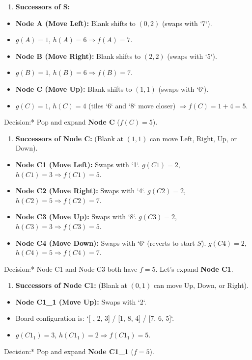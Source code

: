 \begin{enumerate}
  \item \textbf{Successors of S:}
\end{enumerate}
\begin{itemize}
  \item   \textbf{Node A (Move Left):} Blank shifts to $(0,2)$ (swaps with `7`).
  \item   $g(A) = 1$, $h(A) = 6 \Rightarrow f(A) = 7$.
  \item   \textbf{Node B (Move Right):} Blank shifts to $(2,2)$ (swaps with `5`).
  \item   $g(B) = 1$, $h(B) = 6 \Rightarrow f(B) = 7$.
  \item   \textbf{Node C (Move Up):} Blank shifts to $(1,1)$ (swaps with `6`).
  \item   $g(C) = 1$, $h(C) = 4$ (tiles `6` and `8` move closer) $\Rightarrow f(C) = 1 + 4 = 5$.
\end{itemize}
    \textit{   }Decision:* Pop and expand \textbf{Node C} ($f(C) = 5$).

\begin{enumerate}
  \item \textbf{Successors of Node C:} (Blank at $(1,1)$ can move Left, Right, Up, or Down).
\end{enumerate}
\begin{itemize}
  \item   \textbf{Node C1 (Move Left):} Swaps with `1`. $g(C1) = 2$, $h(C1) = 3 \Rightarrow f(C1) = 5$.
  \item   \textbf{Node C2 (Move Right):} Swaps with `4`. $g(C2) = 2$, $h(C2) = 5 \Rightarrow f(C2) = 7$.
  \item   \textbf{Node C3 (Move Up):} Swaps with `8`. $g(C3) = 2$, $h(C3) = 3 \Rightarrow f(C3) = 5$.
  \item   \textbf{Node C4 (Move Down):} Swaps with `6` (reverts to start $S$). $g(C4) = 2$, $h(C4) = 5 \Rightarrow f(C4) = 7$.
\end{itemize}
    \textit{   }Decision:* Node C1 and Node C3 both have $f = 5$. Let's expand \textbf{Node C1}.

\begin{enumerate}
  \item \textbf{Successors of Node C1:} (Blank at $(0,1)$ can move Up, Down, or Right).
\end{enumerate}
\begin{itemize}
  \item   \textbf{Node C1\_1 (Move Up):} Swaps with `2`.
  \item   Board configuration is: `[ , 2, 3] / [1, 8, 4] / [7, 6, 5]`.
  \item   $g(C1_1) = 3$, $h(C1_1) = 2 \Rightarrow f(C1_1) = 5$.
\end{itemize}
    \textit{   }Decision:* Pop and expand \textbf{Node C1\_1} ($f = 5$).

